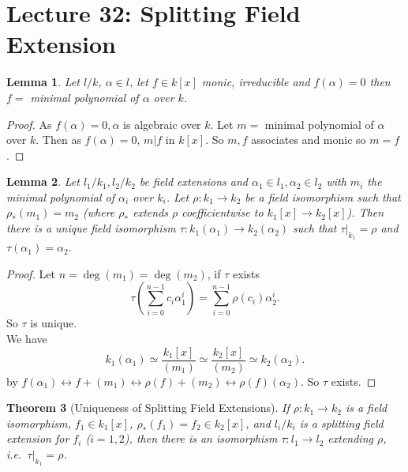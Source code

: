 \documentclass[a4paper,12pt]{article}
\newtheorem{thm}{Theorem}[section]
\newtheorem{lem}[thm]{Lemma}
\begin{document}
\section{Lecture 32: Splitting Field Extension}
\begin{lem}
    Let $l/k$, $\alpha\in l$, let $f\in k[x]$ monic, irreducible and $f(\alpha)=0$ then $f=$ minimal polynomial of $\alpha$ over $k$. 
\end{lem}
\begin{proof}
    As $f(\alpha)=0, \alpha$ is algebraic over $k$. Let $m=$ minimal polynomial of $\alpha$ over $k$. Then as $f(\alpha)=0$, $m|f$ in $k[x]$. So $m,f$ associates and monic so $m=f$. 
\end{proof}
\begin{lem}
    Let $l_1/k_1, l_2/k_2$ be field extensions and $\alpha_1\in l_1, \alpha_2\in l_2$ with $m_i$ the minimal polynomial of $\alpha_i$ over $k_i$. Let $\rho:k_1\to k_2$ be a field isomorphism such that $\rho_*(m_1)=m_2$ (where $\rho_*$ extends $\rho$ coefficientwise to $k_1[x]\to k_2[x]$). Then there is a unique field isomorphism $\tau:k_1(\alpha_1)\to k_2(\alpha_2)$ such that $\tau|_{k_1}=\rho$ and $\tau(\alpha_1)=\alpha_2$. 
\end{lem}
\begin{proof}
    Let $n=\deg(m_1)=\deg(m_2)$, if $\tau$ exists 
    \[
    \tau \left( \sum_{i=0}^{n-1} c_i\alpha_1^i\right)=\sum_{i=0}^{n-1}\rho(c_i)\alpha_2^i
    .\] 
    So $\tau$ is unique. \\
    We have 
    \[
    k_1(\alpha_1)\simeq \frac{k_1[x]}{(m_1)}\simeq \frac{k_2[x]}{(m_2)}\simeq k_2(\alpha_2)
    .\] 
    by $f(\alpha_1)\leftrightarrow f+(m_1)\leftrightarrow \rho(f)+(m_2)\leftrightarrow \rho(f)(\alpha_2)$. So $\tau$ exists. 
\end{proof}
\begin{thm}[Uniqueness of Splitting Field Extensions]
    If $\rho:k_1\to k_2$ is a field isomorphism, $f_1\in k_1[x]$, $\rho_*(f_1)=f_2\in k_2[x]$, and $l_i/k_i$ is a splitting field extension for $f_i$ ($i=1,2$), then there is an isomorphism $\tau:l_1\to l_2$ extending $\rho$, i.e.\ $\tau|_{k_1}=\rho$. 
\end{thm}
\end{document}
